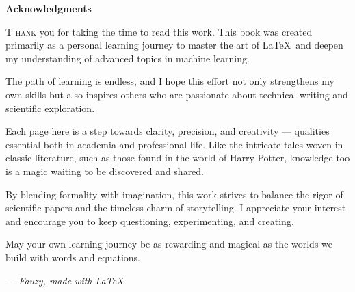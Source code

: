 \documentclass{book}
\begin{document}
\cleardoublepage
\thispagestyle{empty}

\vspace*{3cm}
\begin{center}
    {\Huge\bfseries Acknowledgments}
\end{center}

\vspace{1cm}

\begin{multicols}{2}
\lettrine[lines=3,lhang=0.2,lraise=0.1]{T}{ hank} you for taking the time to read this work. This book was created primarily as a personal learning journey to master the art of \LaTeX\ and deepen my understanding of advanced topics in machine learning. 

The path of learning is endless, and I hope this effort not only strengthens my own skills but also inspires others who are passionate about technical writing and scientific exploration. 

Each page here is a step towards clarity, precision, and creativity — qualities essential both in academia and professional life. Like the intricate tales woven in classic literature, such as those found in the world of Harry Potter, knowledge too is a magic waiting to be discovered and shared.

By blending formality with imagination, this work strives to balance the rigor of scientific papers and the timeless charm of storytelling. I appreciate your interest and encourage you to keep questioning, experimenting, and creating.

May your own learning journey be as rewarding and magical as the worlds we build with words and equations.
\end{multicols}

\vspace{2cm}
\begin{center}
        \textit{— Fauzy, made with \LaTeX{}}
\end{center}
\end{document}
